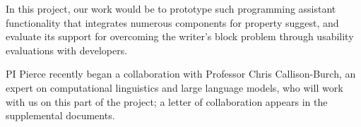 In this project, our work would be to prototype such programming assistant
functionality that integrates numerous components for property suggest,
and evaluate its support for overcoming the writer's block problem through
usability evaluations with developers.

PI Pierce recently began a collaboration with Professor Chris
Callison-Burch, an expert on computational linguistics and large
language models, who will work with us on this part of the project; a
letter of collaboration appears in the supplemental documents.



